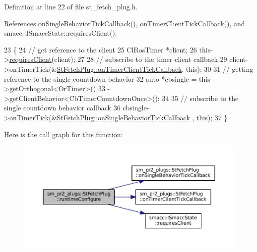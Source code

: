 Definition at line 22 of file st\+\_\+fetch\+\_\+plug.\+h.



References on\+Single\+Behavior\+Tick\+Callback(), on\+Timer\+Client\+Tick\+Callback(), and smacc\+::\+I\+Smacc\+State\+::requires\+Client().


\begin{DoxyCode}
23     \{
24         \textcolor{comment}{// get reference to the client}
25         ClRosTimer *client;
26         this->\hyperlink{classsmacc_1_1ISmaccState_a7f95c9f0a6ea2d6f18d1aec0519de4ac}{requiresClient}(client);
27 
28         \textcolor{comment}{// subscribe to the timer client callback}
29         client->onTimerTick(&\hyperlink{structsm__pr2__plugs_1_1StFetchPlug_aaf8460a7e96dfbfe7eefbd3f2fd41b41}{StFetchPlug::onTimerClientTickCallback}, \textcolor{keyword}{
      this});
30 
31         \textcolor{comment}{// getting reference to the single countdown behavior}
32         \textcolor{keyword}{auto} *cbsingle = this->getOrthogonal<OrTimer>()
33                              ->getClientBehavior<CbTimerCountdownOnce>();
34 
35         \textcolor{comment}{// subscribe to the single countdown behavior callback}
36         cbsingle->onTimerTick(&\hyperlink{structsm__pr2__plugs_1_1StFetchPlug_ae3dc2c0827bd1adb046f000e1caa4c4c}{StFetchPlug::onSingleBehaviorTickCallback}
      , \textcolor{keyword}{this});
37     \}
\end{DoxyCode}
Here is the call graph for this function\+:
\nopagebreak
\begin{figure}[H]
\begin{center}
\leavevmode
\includegraphics[width=350pt]{structsm__pr2__plugs_1_1StFetchPlug_ab366cd931391170e7c7fa3e591c66d73_cgraph}
\end{center}
\end{figure}
\mbox{\label{structsm__pr2__plugs_1_1StFetchPlug_a61bddcfc32e45d16b7b6b6e637f328cc}} 
